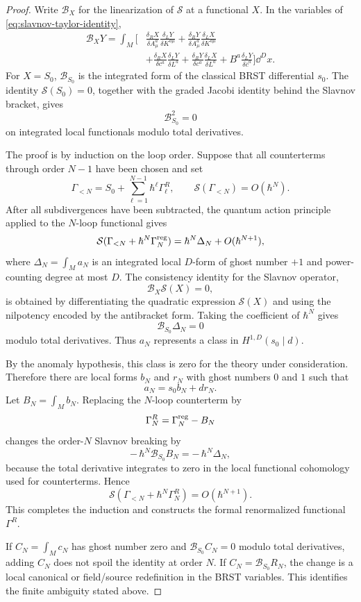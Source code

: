 \begin{proof}
Write \(\mathcal B_X\) for the linearization of \(\mathcal S\) at a functional
\(X\).  In the variables of \eqref{eq:slavnov-taylor-identity},
\[
\begin{aligned}
  \mathcal B_X Y
  =
  \int_M
  \bigg[
  &\frac{\delta_R X}{\delta A_\mu^a}
   \frac{\delta_L Y}{\delta K^{a\mu}}
  +\frac{\delta_R Y}{\delta A_\mu^a}
   \frac{\delta_L X}{\delta K^{a\mu}}
\\
  &+\frac{\delta_R X}{\delta c^a}
   \frac{\delta_L Y}{\delta L^a}
  +\frac{\delta_R Y}{\delta c^a}
   \frac{\delta_L X}{\delta L^a}
  +B^a\frac{\delta_LY}{\delta\bar c^a}
  \bigg]\dd^D x .
\end{aligned}
\]
For \(X=S_0\), \(\mathcal B_{S_0}\) is the integrated form of the classical
BRST differential \(s_0\).  The identity \(\mathcal S(S_0)=0\), together with
the graded Jacobi identity behind the Slavnov bracket, gives
\[
  \mathcal B_{S_0}^2=0
\]
on integrated local functionals modulo total derivatives.

The proof is by induction on the loop order.  Suppose that all counterterms
through order \(N-1\) have been chosen and set
\[
  \Gamma_{<N}
  =
  S_0+\sum_{\ell=1}^{N-1}\hbar^\ell\Gamma^R_\ell ,
  \qquad
  \mathcal S(\Gamma_{<N})=O(\hbar^N).
\]
After all subdivergences have been subtracted, the quantum action principle
applied to the \(N\)-loop functional gives
\[
  \mathcal S(\Gamma_{<N}+\hbar^N\Gamma^{\rm reg}_N)
  =
  \hbar^N\Delta_N+O(\hbar^{N+1}),
\]
where \(\Delta_N=\int_M a_N\) is an integrated local \(D\)-form of ghost number
\(+1\) and power-counting degree at most \(D\).  The consistency identity for
the Slavnov operator,
\[
  \mathcal B_X\mathcal S(X)=0,
\]
is obtained by differentiating the quadratic expression
\(\mathcal S(X)\) and using the nilpotency encoded by the antibracket form.
Taking the coefficient of \(\hbar^N\) gives
\[
  \mathcal B_{S_0}\Delta_N=0
\]
modulo total derivatives.  Thus \(a_N\) represents a class in
\(H^{1,D}(s_0\mid d)\).

By the anomaly hypothesis, this class is zero for the theory under
consideration.  Therefore there are local forms \(b_N\) and \(r_N\) with ghost
numbers \(0\) and \(1\) such that
\[
  a_N=s_0 b_N+d r_N .
\]
Let \(B_N=\int_M b_N\).  Replacing the \(N\)-loop counterterm by
\[
  \Gamma^R_N
  =
  \Gamma^{\rm reg}_N-B_N
\]
changes the order-\(N\) Slavnov breaking by
\[
  -\,\hbar^N \mathcal B_{S_0}B_N
  =
  -\,\hbar^N\Delta_N ,
\]
because the total derivative integrates to zero in the local functional
cohomology used for counterterms.  Hence
\[
  \mathcal S\!\left(\Gamma_{<N}+\hbar^N\Gamma^R_N\right)
  =
  O(\hbar^{N+1}).
\]
This completes the induction and constructs the formal renormalized functional
\(\Gamma^R\).

If \(C_N=\int_M c_N\) has ghost number zero and
\(\mathcal B_{S_0}C_N=0\) modulo total derivatives, adding \(C_N\) does not
spoil the identity at order \(N\).  If \(C_N=\mathcal B_{S_0}R_N\), the change
is a local canonical or field/source redefinition in the BRST variables.  This
identifies the finite ambiguity stated above.
\end{proof}

